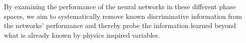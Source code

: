 \begin{enumerate}
\end{enumerate}
By examining the performance of the neural networks in these different phase spaces, we aim to systematically remove known discriminative information from the networks' performance and thereby probe the information learned beyond what is already known by physics inspired variables.


